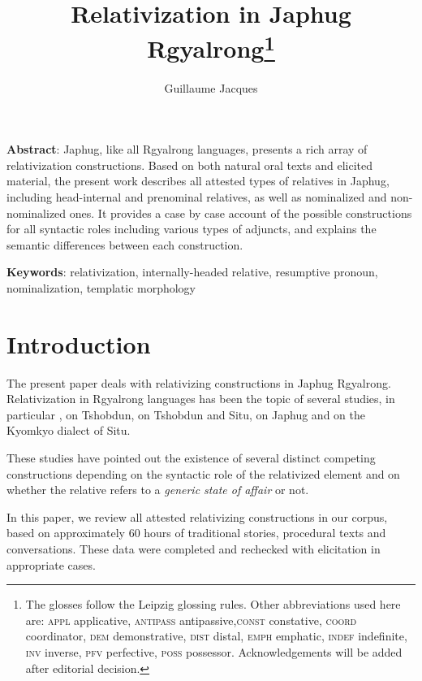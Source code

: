 \documentclass[oldfontcommands,oneside,a4paper,11pt]{article}
\begin{document}
 

\title{Relativization in Japhug Rgyalrong\footnote{
The glosses follow the Leipzig glossing rules. Other abbreviations used here are: \textsc{appl} applicative, \textsc{antipass} antipassive,\textsc{const} constative, \textsc{coord} coordinator, \textsc{dem} demonstrative, \textsc{dist} distal, \textsc{emph} emphatic, \textsc{indef} indefinite, \textsc{inv} inverse,  \textsc{pfv} perfective, \textsc{poss} possessor. %
Acknowledgements will be added after editorial decision. %
} }
\author{Guillaume Jacques}
\maketitle
\linenumbers
\textbf{Abstract}: Japhug, like all Rgyalrong languages, presents a rich array of relativization constructions. Based on both natural oral texts and elicited material, the present work  describes all attested types of relatives in Japhug, including head-internal and prenominal relatives, as well as nominalized and non-nominalized ones. It provides a case by case account of the possible constructions for all syntactic roles including various types of adjuncts, and explains the semantic differences between each construction.



\textbf{Keywords}: relativization, internally-headed relative, resumptive pronoun, nominalization, templatic morphology
\section{Introduction}
The present paper deals with relativizing constructions in Japhug Rgyalrong. Relativization in Rgyalrong languages has been the topic of several studies, in particular  \citet{genetti08nmlz}, \citet{jackson06guanxiju} on Tshobdun,  \citet{jacksonlin07} on Tshobdun and Situ, \citet{jacques08} on Japhug and  \citet{prins11kyomkyo} on the Kyomkyo dialect of Situ.

These studies have pointed out the existence of several distinct competing constructions depending on the syntactic role of the relativized element and on whether the relative refers to a \textit{generic state of affair} or not.

In this paper, we review all attested relativizing constructions in our corpus, based on approximately 60 hours of traditional stories, procedural texts and conversations. These data were completed and rechecked with elicitation in appropriate cases. 
\end{document}
